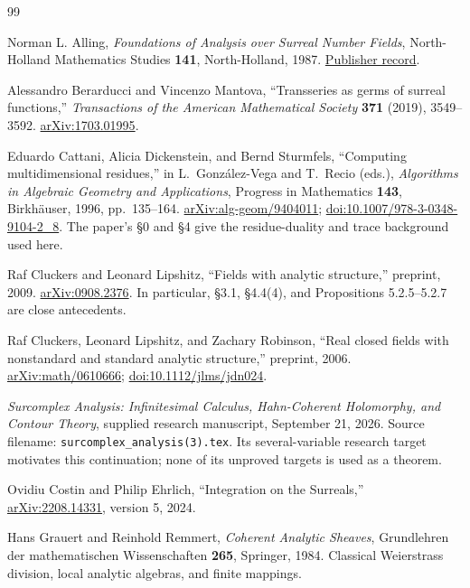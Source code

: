 \documentclass[11pt,letterpaper]{article}
\theoremstyle{definition}
\theoremstyle{remark}
\numberwithin{equation}{section}
\begin{document}
\begin{thebibliography}{99}

Norman L. Alling,
\emph{Foundations of Analysis over Surreal Number Fields},
North-Holland Mathematics Studies \textbf{141}, North-Holland, 1987.
\href{https://shop.elsevier.com/books/foundations-of-analysis-over-surreal-number-fields/alling/978-0-444-70226-5}{Publisher record}.

Alessandro Berarducci and Vincenzo Mantova,
``Transseries as germs of surreal functions,''
\emph{Transactions of the American Mathematical Society} \textbf{371} (2019), 3549--3592.
\href{https://arxiv.org/abs/1703.01995}{arXiv:1703.01995}.

Eduardo Cattani, Alicia Dickenstein, and Bernd Sturmfels,
``Computing multidimensional residues,'' in L.~Gonz\'alez-Vega and T.~Recio (eds.),
\emph{Algorithms in Algebraic Geometry and Applications},
Progress in Mathematics \textbf{143}, Birkh\"auser, 1996, pp.~135--164.
\href{https://arxiv.org/abs/alg-geom/9404011}{arXiv:alg-geom/9404011};
\href{https://doi.org/10.1007/978-3-0348-9104-2_8}{doi:10.1007/978-3-0348-9104-2\_8}.
The paper's \S0 and \S4 give the residue-duality and trace background used here.

Raf Cluckers and Leonard Lipshitz,
``Fields with analytic structure,'' preprint, 2009.
\href{https://arxiv.org/abs/0908.2376}{arXiv:0908.2376}.
In particular, \S3.1, \S4.4(4), and Propositions 5.2.5--5.2.7 are close antecedents.

Raf Cluckers, Leonard Lipshitz, and Zachary Robinson,
``Real closed fields with nonstandard and standard analytic structure,'' preprint, 2006.
\href{https://arxiv.org/abs/math/0610666}{arXiv:math/0610666};
\href{https://doi.org/10.1112/jlms/jdn024}{doi:10.1112/jlms/jdn024}.

\emph{Surcomplex Analysis: Infinitesimal Calculus, Hahn-Coherent Holomorphy, and Contour Theory},
supplied research manuscript, September 21, 2026.
Source filename: \texttt{surcomplex\_analysis(3).tex}.
Its several-variable research target motivates this continuation; none of its unproved targets is used as a theorem.

Ovidiu Costin and Philip Ehrlich,
``Integration on the Surreals,''
\href{https://arxiv.org/abs/2208.14331}{arXiv:2208.14331}, version 5, 2024.

Hans Grauert and Reinhold Remmert,
\emph{Coherent Analytic Sheaves},
Grundlehren der mathematischen Wissenschaften \textbf{265}, Springer, 1984.
Classical Weierstrass division, local analytic algebras, and finite mappings.


\end{thebibliography}
\end{document}
